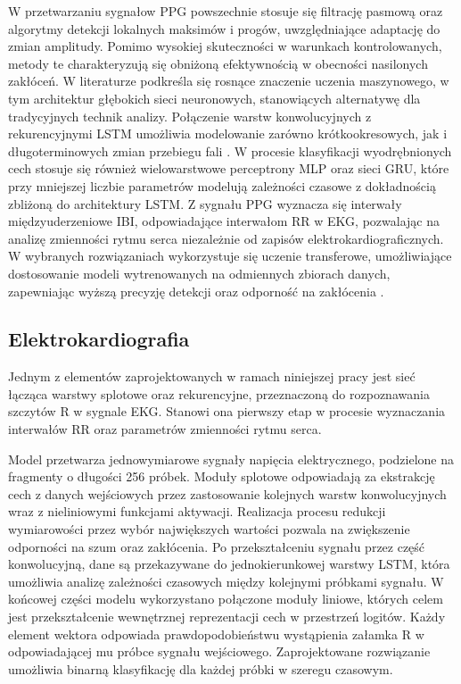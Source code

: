 \documentclass[journal]{IEEEtran}
\begin{document}
W przetwarzaniu sygnałow PPG powszechnie stosuje się filtrację pasmową oraz algorytmy detekcji lokalnych maksimów i progów, uwzględniające adaptację do zmian amplitudy. Pomimo wysokiej skuteczności w warunkach kontrolowanych, metody te charakteryzują się obniżoną efektywnością w obecności nasilonych zakłóceń. W literaturze podkreśla się rosnące znaczenie  uczenia maszynowego, w tym architektur głębokich sieci neuronowych, stanowiących  alternatywę dla tradycyjnych technik analizy. Połączenie warstw konwolucyjnych z rekurencyjnymi LSTM umożliwia modelowanie zarówno krótkookresowych, jak i długoterminowych zmian przebiegu fali \cite{5}. W procesie klasyfikacji wyodrębnionych cech stosuje się również wielowarstwowe perceptrony MLP oraz sieci GRU, które przy mniejszej liczbie parametrów modelują zależności czasowe z dokładnością zbliżoną do architektury LSTM.
Z sygnału PPG wyznacza się interwały międzyuderzeniowe IBI, odpowiadające interwałom RR w EKG, pozwalając na analizę zmienności rytmu serca niezależnie od zapisów elektrokardiograficznych. W wybranych rozwiązaniach wykorzystuje się uczenie transferowe, umożliwiające dostosowanie modeli wytrenowanych na odmiennych zbiorach danych, zapewniając wyższą precyzję detekcji oraz odporność na zakłócenia \cite{6}.


\subsection{Elektrokardiografia}
Jednym z elementów zaprojektowanych w ramach niniejszej pracy jest sieć łącząca warstwy splotowe oraz rekurencyjne, przeznaczoną do rozpoznawania szczytów R w sygnale EKG. Stanowi ona pierwszy etap w procesie wyznaczania interwałów RR oraz parametrów zmienności rytmu serca.

Model przetwarza jednowymiarowe sygnały napięcia elektrycznego, podzielone na fragmenty o długości 256 próbek. Moduły splotowe odpowiadają za ekstrakcję cech z danych wejściowych przez zastosowanie kolejnych warstw konwolucyjnych wraz z nieliniowymi funkcjami aktywacji. Realizacja procesu redukcji wymiarowości przez wybór największych wartości pozwala na zwiększenie odporności na szum oraz zakłócenia. Po przekształceniu sygnału przez część konwolucyjną, dane są przekazywane do jednokierunkowej warstwy LSTM, która umożliwia analizę zależności czasowych między kolejnymi próbkami sygnału. W końcowej części modelu wykorzystano połączone moduły liniowe, których celem jest przekształcenie wewnętrznej reprezentacji cech w przestrzeń logitów. Każdy element wektora odpowiada prawdopodobieństwu wystąpienia załamka R w odpowiadającej mu próbce sygnału wejściowego. Zaprojektowane rozwiązanie umożliwia binarną klasyfikację dla każdej próbki w szeregu czasowym.
\end{document}
